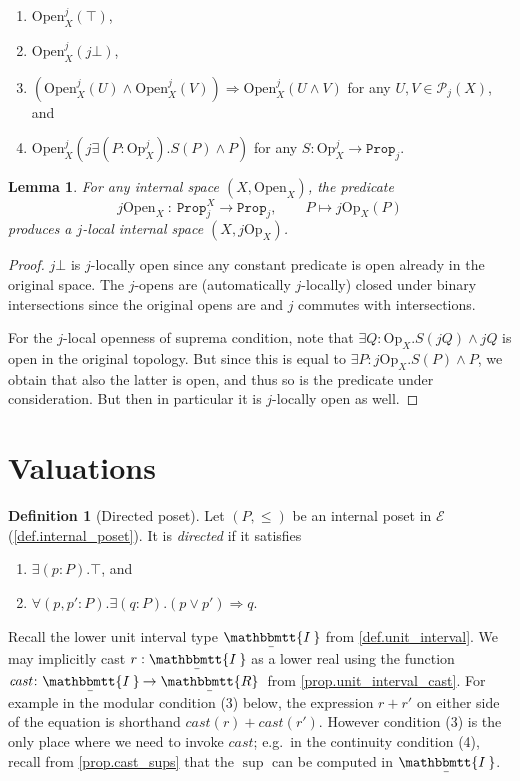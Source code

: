 \documentclass[11pt, oneside, article]{memoir}
\theoremstyle{plain}
\newtheorem{lemma}[theorem]{Lemma}
\theoremstyle{definition}
\newtheorem{definition}[theorem]{Definition}
\theoremstyle{remark}
\newcommand{\const}[1]{\mathtt{#1}}
\newcommand{\Set}[1]{\mathrm{#1}}
\newcommand{\cat}[1]{\mathcal{#1}}
\newcommand{\ubar}[1]{\underaccent{\bar}{#1}}
\newcommand{\internal}[1]{\raisebox{-.03ex}{$\mathbbmtt{#1}$}}
\newcommand{\hs}{\hspace{1.1pt}}
\newcommand{\trr}{\internal{R}\hs}
\newcommand{\tii}{\ubar{\internal{I\hs\hs}}\!\hs}
\newcommand{\tlrr}{\ubar{\trr}\hs}
\newcommand{\cast}{\textit{cast}}
\newcommand{\pow}{\mathcal{P}}
\newcommand{\prop}{\const{Prop}}
\newcommand{\Op}{\Set{Op}}
\newcommand{\Open}{\Set{Open}}
\newcommand{\imp}{\Rightarrow}
\begin{document}
\begin{enumerate}
	\item $\Open_X^j(\top)$,
	\item $\Open_X^j(j\bot)$,
	\item $(\Open_X^j(U)\wedge\Open_X^j(V))\imp \Open_X^j(U\wedge V)$ for any $U,V\in\pow_j(X)$, and
	\item $\Open_X^j(j\exists(P:\Op_X^j).S(P)\wedge P)$ for any $S\colon\Op_X^j\to\prop_j$. 
\end{enumerate}

\begin{lemma}
	\label{space_localize}
	For any internal space $(X,\Open_X)$, the predicate
	\[
		j \Open_X \: : \: \prop_j^X \longrightarrow \prop_j, \qquad P \longmapsto j \Op_X(P)
	\]
	produces a $j$-local internal space $(X,j \Op_X)$.
\end{lemma}

\begin{proof}
	$j\bot$ is $j$-locally open since any constant predicate is open already in the original space.	The $j$-opens are (automatically $j$-locally) closed under binary intersections since the original opens are and $j$ commutes with intersections. 

	For the $j$-local openness of suprema condition, note that $\exists Q : \Op_X . S(jQ) \land jQ$ is open in the original topology. But since this is equal to $\exists P : j \Op_X . S(P) \land P$, we obtain that also the latter is open, and thus so is the predicate under consideration. But then in particular it is $j$-locally open as well.
\end{proof}

\section{Valuations}\label{sec.valuations}

\begin{definition}[Directed poset]\label{def.directed}
Let $(P,\leq)$ be an internal poset in $\cat{E}$ (\cref{def.internal_poset}). It is \emph{directed} if it satisfies
\begin{enumerate}
	\item $\exists(p:P).\top$, and
	\item $\forall(p,p':P).\exists(q:P).(p\vee p')\imp q$.
\end{enumerate}
\end{definition}


Recall the lower unit interval type $\tii$ from \cref{def.unit_interval}. We may implicitly cast $r:\tii$ as a lower real using the function $\cast\colon\tii\to\tlrr$ from \cref{prop.unit_interval_cast}. For example in the modular condition (3) below, the expression $r+r'$ on either side of the equation is shorthand $\cast(r)+\cast(r')$. However condition (3) is the only place where we need to invoke $\cast$; e.g.\ in the continuity condition (4), recall from \cref{prop.cast_sups} that the $\sup$ can be computed in $\tii$.
\end{document}
